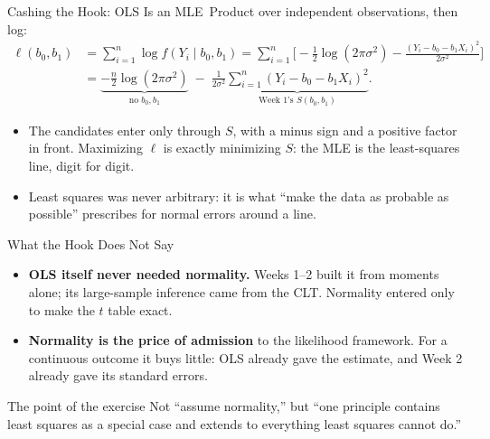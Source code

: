 \documentclass[aspectratio=169,11pt,xcolor=dvipsnames]{beamer}
\newcommand{\loglik}{\ell}
\newcommand{\core}{\,\raisebox{0.6pt}{\textcolor{corestar}{$\bigstar$}}}
\begin{document}
\begin{frame}{Cashing the Hook: OLS Is an MLE\core}
Product over independent observations, then log:
\begin{align*}
  \loglik(b_0, b_1)
  &= \sum_{i=1}^n \log f(Y_i \mid b_0, b_1)
   = \sum_{i=1}^n \Big[ -\tfrac12\log(2\pi\sigma^2)
     - \frac{(Y_i - b_0 - b_1X_i)^2}{2\sigma^2} \Big] \\[1pt]
  &= \underbrace{-\frac n2\log(2\pi\sigma^2)}_{\text{no } b_0, b_1}
     \;-\; \frac{1}{2\sigma^2}
     \underbrace{\sum_{i=1}^n (Y_i - b_0 - b_1X_i)^2}_{\text{Week 1's } S(b_0,b_1)} .
\end{align*}
\begin{itemize}\itemsep2pt
  \item The candidates enter only through $S$, with a minus sign and a
        positive factor in front. \alert{Maximizing $\loglik$ is exactly
        minimizing $S$}: the MLE is the least-squares line, digit for digit.
  \item Least squares was never arbitrary: it is what ``make the data as
        probable as possible'' prescribes for normal errors around a line.
\end{itemize}
\end{frame}

\begin{frame}{What the Hook Does Not Say\core}
\begin{itemize}\itemsep6pt
  \item \textbf{OLS itself never needed normality.} Weeks 1--2 built it
        from moments alone; its large-sample inference came from the CLT.
        Normality entered only to make the $t$ table exact.
  \item \textbf{Normality is the price of admission} to the likelihood
        framework. For a continuous outcome it buys little: OLS already
        gave the estimate, and Week 2 already gave its standard errors.
\end{itemize}
\vskip6pt
\begin{block}{The point of the exercise}
Not ``assume normality,'' but ``one principle contains least squares as a
special case and extends to everything least squares cannot do.''
\end{block}
\end{frame}
\end{document}
